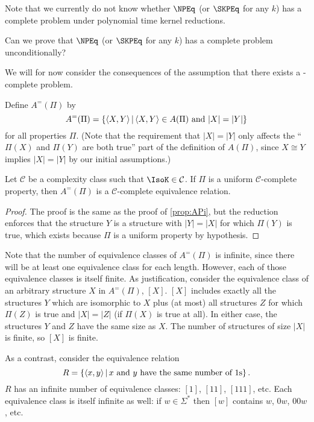 Note that we currently do not know whether $\NPEq$ (or $\SKPEq$ for any $k$) has a complete problem under polynomial time kernel reductions.
\begin{openproblem}
  Can we prove that $\NPEq$ (or $\SKPEq$ for any $k$) has a complete problem unconditionally?
\end{openproblem}

We will for now consider the consequences of the assumption that there exists a \CEq-complete problem.

Define $A^=(\Pi)$ by
\begin{displaymath}
  A^=(\Pi) = \left\{ \left\langle X,Y\right\rangle \,\middle|\, \left\langle X,Y\right\rangle\in A(\Pi) \text{ and } |X|=|Y|\right\}
\end{displaymath}
for all properties $\Pi$.
(Note that the requirement that $|X|=|Y|$ only affects the ``$\Pi(X)$ and $\Pi(Y)$ are both true'' part of the definition of $A(\Pi)$, since $X\cong Y$ implies $|X|=|Y|$ by our initial assumptions.)

\begin{proposition}\label{prop:APieq}
  Let $\mathcal{C}$ be a complexity class such that $\IsoK\in\mathcal{C}$.
  If $\Pi$ is a uniform $\mathcal{C}$-complete property, then $A^=(\Pi)$ is a $\mathcal{C}$-complete equivalence relation.
\end{proposition}
\begin{proof}
  The proof is the same as the proof of \autoref{prop:APi}, but the reduction enforces that the structure $Y$ is a structure with $|Y|=|X|$ for which $\Pi(Y)$ is true, which exists because $\Pi$ is a uniform property by hypothesis.
\end{proof}

Note that the number of equivalence classes of $A^=(\Pi)$ is infinite, since there will be at least one equivalence class for each length.
However, each of those equivalence classes is itself finite.
As justification, consider the equivalence class of an arbitrary structure $X$ in $A^=(\Pi)$, $[X]$.
$[X]$ includes exactly all the structures $Y$ which are isomorphic to $X$ plus (at most) all structures $Z$ for which $\Pi(Z)$ is true and $|X|=|Z|$ (if $\Pi(X)$ is true at all).
In either case, the structures $Y$ and $Z$ have the same size as $X$.
The number of structures of size $|X|$ is finite, so $[X]$ is finite.

As a contrast, consider the equivalence relation
\begin{displaymath}
  R=\left\{\left\langle x,y\right\rangle \,\middle|\, x\text{ and }y\text{ have the same number of }1\textnormal{s}\right\}.
\end{displaymath}
$R$ has an infinite number of equivalence classes: $[1]$, $[11]$, $[111]$, etc.
Each equivalence class is itself infinite as well: if $w\in\Sigma^*$ then $[w]$ contains $w$, $0w$, $00w$, etc.


